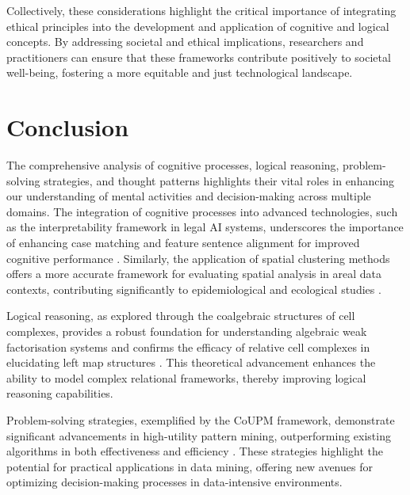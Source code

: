 Collectively, these considerations highlight the critical importance of integrating ethical principles into the development and application of cognitive and logical concepts. By addressing societal and ethical implications, researchers and practitioners can ensure that these frameworks contribute positively to societal well-being, fostering a more equitable and just technological landscape.












\section{Conclusion} \label{sec:Conclusion}







The comprehensive analysis of cognitive processes, logical reasoning, problem-solving strategies, and thought patterns highlights their vital roles in enhancing our understanding of mental activities and decision-making across multiple domains. The integration of cognitive processes into advanced technologies, such as the interpretability framework in legal AI systems, underscores the importance of enhancing case matching and feature sentence alignment for improved cognitive performance \cite{lin2023interpretabilityframeworksimilarcase}. Similarly, the application of spatial clustering methods offers a more accurate framework for evaluating spatial analysis in areal data contexts, contributing significantly to epidemiological and ecological studies \cite{vidanapathirana2022clusterdetectioncapabilitiesaverage}.



Logical reasoning, as explored through the coalgebraic structures of cell complexes, provides a robust foundation for understanding algebraic weak factorisation systems and confirms the efficacy of relative cell complexes in elucidating left map structures \cite{athorne2013coalgebraicstructurecellcomplexes}. This theoretical advancement enhances the ability to model complex relational frameworks, thereby improving logical reasoning capabilities.



Problem-solving strategies, exemplified by the CoUPM framework, demonstrate significant advancements in high-utility pattern mining, outperforming existing algorithms in both effectiveness and efficiency \cite{gan2019correlatedutilitybasedpatternmining}. These strategies highlight the potential for practical applications in data mining, offering new avenues for optimizing decision-making processes in data-intensive environments.




